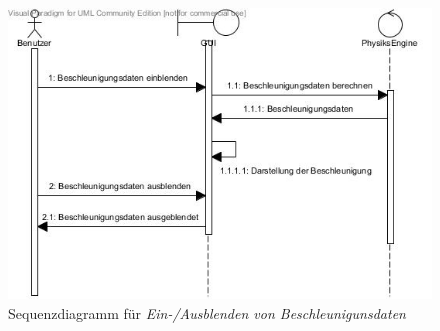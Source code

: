 \begin{figure}[h!]
\includegraphics[width=\linewidth]{bilder/Simulator_Beschleunigung}
\caption{Sequenzdiagramm für \textit{Ein-/Ausblenden von Beschleunigunsdaten}}
\label{fig:Simulator_Beschleunigung}
\end{figure}

\newpage

